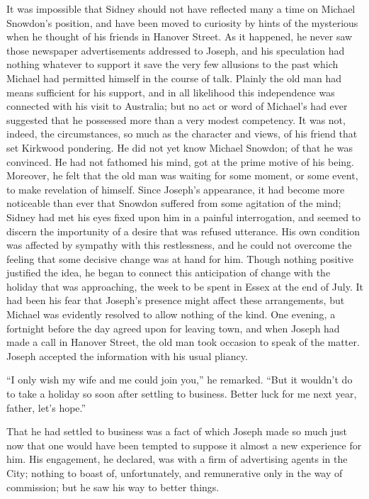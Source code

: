 It was impossible that Sidney should not have reflected many a time on
Michael Snowdon's position, and have been moved to curiosity by hints of
the mysterious when he thought of his friends in Hanover Street. As it
happened, he never saw those newspaper advertisements addressed to
Joseph, and his speculation had nothing whatever to support it save the
very few allusions to the past which Michael had permitted himself in
the course of talk. Plainly the old man had means sufficient for his
support, and in all likelihood this independence was connected with his
visit to Australia; but no act or word of Michael's had ever suggested
that he possessed more than a very modest competency. It was not,
indeed, the circumstances, so much as the character and views, of his
friend that set Kirkwood pondering. He did not yet know Michael Snowdon;
of that he was {}convinced. He had not fathomed his mind, got at the
prime motive of his being. Moreover, he felt that the old man was
waiting for some moment, or some event, to make revelation of himself.
Since Joseph's appearance, it had become more noticeable than ever that
Snowdon suffered from some agitation of the mind; Sidney had met his
eyes fixed upon him in a painful interrogation, and seemed to discern
the importunity of a desire that was refused utterance. His own
condition was affected by sympathy with this restlessness, and he could
not overcome the feeling that some decisive change was at hand for him.
Though nothing positive justified the idea, he began to connect this
anticipation of change with the holiday that was approaching, the week
to be spent in Essex at the end of July. It had been his fear that
Joseph's presence might affect these arrangements, but Michael was
evidently resolved to allow nothing of the kind. One evening, a
fortnight before the day agreed upon for leaving town, and when Joseph
had made a call in {}Hanover Street, the old man took occasion to speak
of the matter. Joseph accepted the information with his usual pliancy.

``I only wish my wife and me could join you,'' he remarked. ``But it
wouldn't do to take a holiday so soon after settling to business. Better
luck for me next year, father, let's hope.''

That he had settled to business was a fact of which Joseph made so much
just now that one would have been tempted to suppose it almost a new
experience for him. His engagement, he declared, was with a firm of
advertising agents in the City; nothing to boast of, unfortunately, and
remunerative only in the way of commission; but he saw his way to better
things.

